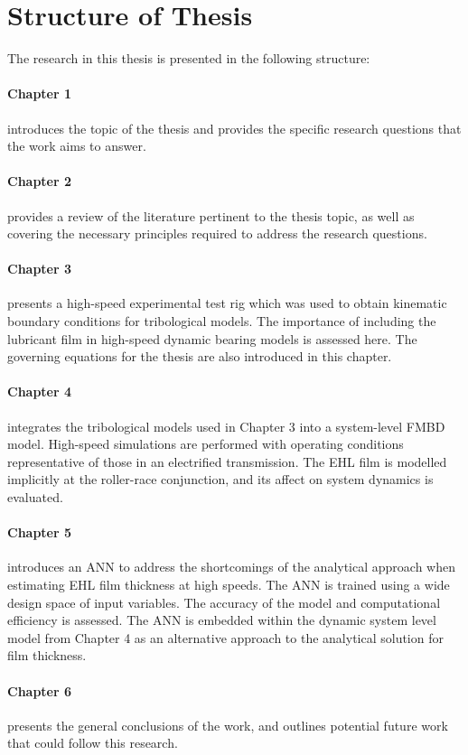 \section{Structure of Thesis} \label{Structure of Thesis}

The research in this thesis is presented in the following structure:

\paragraph{Chapter 1} introduces the topic of the thesis and provides the specific research questions that the work aims to answer.

\paragraph{Chapter 2} provides a review of the literature pertinent to the thesis topic, as well as covering the necessary principles required to address the research questions.

\paragraph{Chapter 3} presents a high-speed experimental test rig which was used to obtain kinematic boundary conditions for tribological models. The importance of including the lubricant film in high-speed dynamic bearing models is assessed here. The governing equations for the thesis are also introduced in this chapter.

\paragraph{Chapter 4} integrates the tribological models used in Chapter 3 into a system-level FMBD model. High-speed simulations are performed with operating conditions representative of those in an electrified transmission. The EHL film is modelled implicitly at the roller-race conjunction, and its affect on system dynamics is evaluated.

\paragraph{Chapter 5} introduces an ANN  to address the shortcomings of the analytical approach when estimating EHL film thickness at high speeds. The ANN is trained using a wide design space of input variables. The accuracy of the model and computational efficiency is assessed. The ANN is embedded within the dynamic system level model from Chapter 4 as an alternative approach to the analytical solution for film thickness. 

\paragraph{Chapter 6} presents the general conclusions of the work, and outlines potential future work that could follow this research.